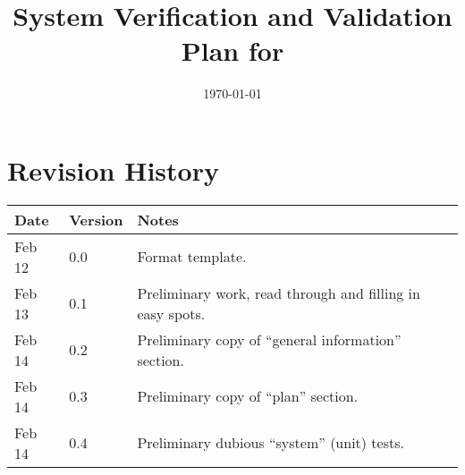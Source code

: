 \documentclass[12pt, titlepage]{article}
\begin{document}

\title{System Verification and Validation Plan for \progname{}}
\author{\authname}
\date{\today}

\maketitle



\section{Revision History}

\begin{tabularx}{\textwidth}{p{3cm}p{2cm}X} \toprule {
    \bf Date} & {\bf Version} & {\bf Notes}                                               \\
    \midrule
    Feb 12    & 0.0           & Format template.                                          \\
    Feb 13    & 0.1           & Preliminary work, read through and filling in easy spots. \\
    Feb 14    & 0.2           & Preliminary copy of ``general information'' section.      \\
    Feb 14    & 0.3           & Preliminary copy of ``plan'' section.                     \\
    Feb 14    & 0.4           & Preliminary dubious ``system'' (unit) tests.              \\
    \bottomrule
\end{tabularx}

\newpage

\tableofcontents

\newpage{}
\end{document}
